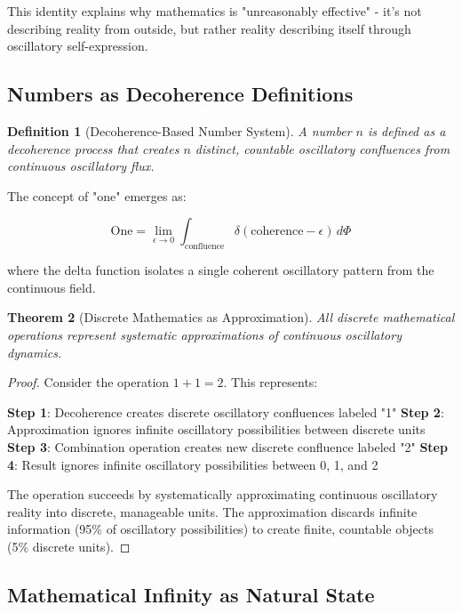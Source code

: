 \documentclass[11pt]{article}
\newtheorem{theorem}{Theorem}[section]
\newtheorem{definition}[theorem]{Definition}
\theoremstyle{remark}
\begin{document}
This identity explains why mathematics is "unreasonably effective" - it's not describing reality from outside, but rather reality describing itself through oscillatory self-expression.

\subsection{Numbers as Decoherence Definitions}

\begin{definition}[Decoherence-Based Number System]
A number $n$ is defined as a decoherence process that creates $n$ distinct, countable oscillatory confluences from continuous oscillatory flux.
\end{definition}

The concept of "one" emerges as:

$$\text{One} = \lim_{\epsilon \to 0} \int_{\text{confluence}} \delta(\text{coherence} - \epsilon) \, d\Phi$$

where the delta function isolates a single coherent oscillatory pattern from the continuous field.

\begin{theorem}[Discrete Mathematics as Approximation]
All discrete mathematical operations represent systematic approximations of continuous oscillatory dynamics.
\end{theorem}

\begin{proof}
Consider the operation $1 + 1 = 2$. This represents:

\textbf{Step 1}: Decoherence creates discrete oscillatory confluences labeled "1"
\textbf{Step 2}: Approximation ignores infinite oscillatory possibilities between discrete units
\textbf{Step 3}: Combination operation creates new discrete confluence labeled "2"
\textbf{Step 4}: Result ignores infinite oscillatory possibilities between 0, 1, and 2

The operation succeeds by systematically approximating continuous oscillatory reality into discrete, manageable units. The approximation discards infinite information (95\% of oscillatory possibilities) to create finite, countable objects (5\% discrete units).
\end{proof}

\subsection{Mathematical Infinity as Natural State}
\end{document}
